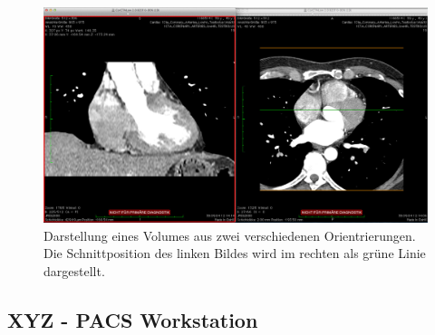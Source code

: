 \begin{figure}[t]
	\centering
	\includegraphics[width=0.8\linewidth]{img/c2_osirix_2d_view_splitscreen.jpg}
	\caption{Darstellung eines Volumes aus zwei verschiedenen Orientrierungen. Die Schnittposition des linken Bildes wird im rechten als grüne Linie dargestellt.}
\end{figure}

\subsection{XYZ - PACS Workstation}
\label{sec:XYZ - PACS Workstation}



